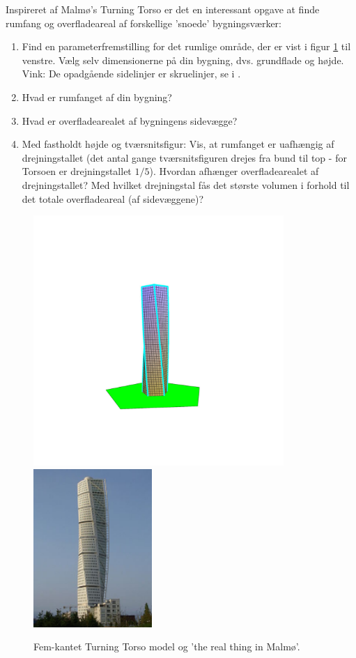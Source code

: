 \begin{exercise}
Inspireret af Malmø's {Turning Torso} er det en interessant opgave at finde rumfang og overfladeareal af
forskellige 'snoede' bygningsværker:
\begin{enumerate}
\item Find en parameterfremstilling for det rumlige område, der er vist i figur \ref{figTurningTorso} til venstre. Vælg selv dimensionerne på din bygning, dvs. grundflade og højde. Vink: De opadgående sidelinjer er skruelinjer, se    i  .
\item Hvad er rumfanget af din bygning?
\item Hvad er overfladearealet af bygningens sidevægge?
\item Med fastholdt højde og tværsnitsfigur: Vis, at rumfanget er uafhængig af drejningstallet (det antal gange
tværsnitsfiguren drejes fra bund til top - for Torsoen er drejningstallet $1/5$). Hvordan afhænger overfladearealet af drejningstallet? Med hvilket drej\-nings\-tal fås det største volumen i forhold til det totale overfladeareal (af sidevæggene)?
\end{enumerate}
\end{exercise}

\begin{figure}[h]
\centerline{\includegraphics[height=95mm]{FIGS/plotTorso} \includegraphics[height=60mm]{FIGS/Turning_Torso_3}}
\begin{center}
\caption{\small{Fem-kantet Turning Torso model og 'the real thing in Malmø'.}}
\label{figTurningTorso}
\end{center}
\end{figure}


